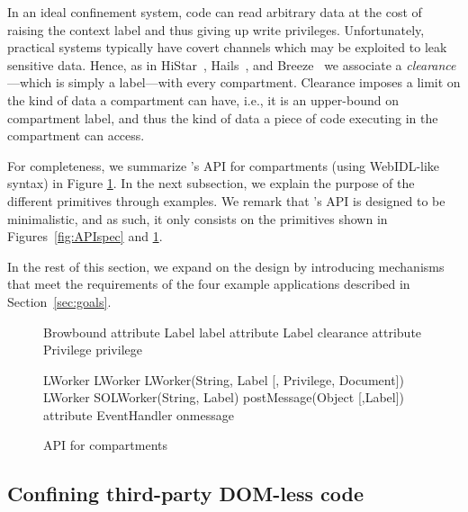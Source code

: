 In an ideal confinement system, code can read arbitrary data at the
cost of raising the context label and thus giving up write privileges.
%
Unfortunately, practical systems typically have covert channels which
may be exploited to leak sensitive data.
%
Hence, as in HiStar~\cite{Zeldovich:2006}, Hails~\cite{giffin:2012:hails}, and
Breeze~\cite{Breeze13} we associate a \emph{clearance}---which is
simply a label---with every compartment.
%
Clearance imposes a limit on the kind of data a compartment can have,
i.e., it is an upper-bound on compartment label, and thus the kind of
data a piece of code executing in the compartment can access.

For completeness, we summarize  \sys{}'s API for compartments
(using WebIDL-like syntax) in Figure \ref{systemAPI}. In the next subsection, 
we explain the purpose of the different primitives through examples. 
We remark that \sys{}'s API is designed to be minimalistic, and as such, it only
consists on the primitives shown in Figures~\ref{fig:APIspec} and
\ref{systemAPI}.

In the rest of this section, we expand on the \sys{} design by
introducing mechanisms that meet the requirements of the four
example applications described in Section~\ref{sec:goals}.
%


\begin{figure}
{\small
\begin{webidl}
Browbound {
  attribute Label label
  attribute Label clearance 
  attribute Privilege privilege
}
\end{webidl}
\begin{webidl}
LWorker {
  LWorker LWorker(String, Label
                  [, Privilege, Document])
  LWorker SOLWorker(String, Label)
  postMessage(Object [,Label])
  attribute EventHandler onmessage
}
\end{webidl}
}
\caption{\label{systemAPI} API for compartments}
\end{figure}


\subsection{Confining third-party DOM-less code}
\label{sec:system:worker}

